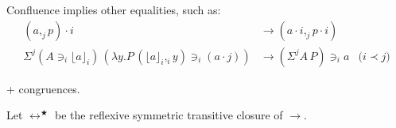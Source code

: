 \documentclass[10pt,a4paper]{article}
\newcommand\CP[3]{(#2,_{#1} #3)}
\newcommand\param[1]{\!\cdot\!#1}
\newcommand\op[1]{∋_{#1}}
\newcommand\ip[3]{Σ^{#1} {#2}\,{#3}}
\newcommand\proj[2]{⌊{#2}⌋_{#1}}
\begin{document}
Confluence implies other equalities, such as:
\begin{align*}
  {(a,_j p)} \param i &→ (a \param i ,_j p \param i)\\
  \ip j {(A \op i {\proj i a})} {(λy. P \, \CP i {\proj i a} y \op i {(a \param j)})} &→ {(\ip j A P)} \op i a &\text{($i \prec j$)}
\end{align*}

+ congruences.

\begin{definition}[Conversion]
  Let $↔^★$ be the reflexive symmetric transitive closure of $→$.
\end{definition}
\end{document}
